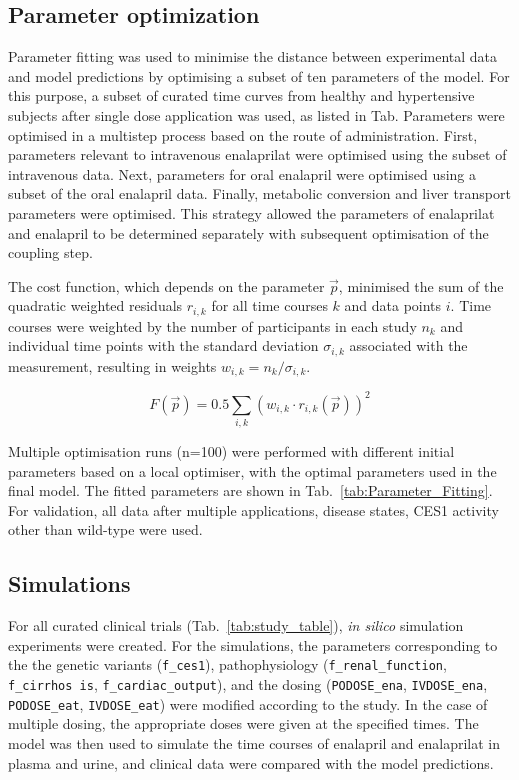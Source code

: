 
\subsection{Parameter optimization}
\label{sec:methods_fitting}
Parameter fitting was used to minimise the distance between experimental data and model predictions by optimising a subset of ten parameters of the model. For this purpose, a subset of curated time curves from healthy and hypertensive subjects after single dose application was used, as listed in Tab.
Parameters were optimised in a multistep process based on the route of administration. First, parameters relevant to intravenous enalaprilat were optimised using the subset of intravenous data. Next, parameters for oral enalapril were optimised using a subset of the oral enalapril data. Finally, metabolic conversion and liver transport parameters were optimised. This strategy allowed the parameters of enalaprilat and enalapril to be determined separately with subsequent optimisation of the coupling step.

The cost function, which depends on the parameter $\vec{p}$, minimised the sum of the quadratic weighted residuals $r_{i,k}$ for all time courses $k$ and data points $i$. Time courses were weighted by the number of participants in each study $n_k$ and individual time points with the standard deviation $\sigma_{i,k}$ associated with the measurement, resulting in weights $w_{i,k} = n_k/\sigma_{i,k}$.

\begin{equation*}
   F(\vec{p})= 0.5 \sum_{i,k} (w_{i,k} \cdot r_{i,k}(\vec{p}))^2
\end{equation*}

Multiple optimisation runs (n=100) were performed with different initial parameters based on a local optimiser, with the optimal parameters used in the final model. The fitted parameters are shown in Tab.~\ref{tab:Parameter_Fitting}. For validation, all data after multiple applications, disease states, CES1 activity other than wild-type were used.

\subsection{Simulations}
\label{sec:methods_simulations}
For all curated clinical trials (Tab.~\ref{tab:study_table}), \textit{in silico} simulation experiments were created. For the simulations, the parameters corresponding to the the genetic variants (\texttt{f\_ces1}), pathophysiology (\texttt{f\_renal\_function}, \texttt{f\_cirrhos
is}, \texttt{f\_cardiac\_output}),  and the dosing (\texttt{PODOSE\_ena}, \texttt{IVDOSE\_ena}, \texttt{PODOSE\_eat}, \texttt{IVDOSE\_eat}) were modified according to the study. In the case of multiple dosing, the appropriate doses were given at the specified times. The model was then used to simulate the time courses of enalapril and enalaprilat in plasma and urine, and clinical data were compared with the model predictions.

